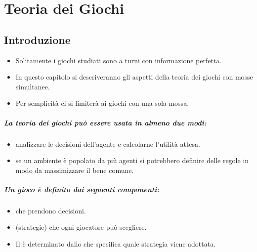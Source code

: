 \chapter{Teoria dei Giochi}

\section{Introduzione}



\begin{itemize}
  \item Solitamente i giochi studiati sono a turni con informazione perfetta. 
  \item In questo capitolo si descriveranno gli aspetti della teoria dei giochi con mosse simultanee. 
  \item Per semplicità ci si limiterà ai giochi con una sola mossa.
\end{itemize}


\paragraph{La teoria dei giochi può essere usata in almeno due modi:}

\begin{itemize}
  \item {} analizzare le decisioni dell'agente e calcolarne l'utilità attesa.
  \item {} se un ambiente è popolato da più agenti si potrebbero definire delle regole in modo da massimizzare il bene comune.
\end{itemize}

\paragraph{Un gioco è definito dai seguenti componenti:}

\begin{itemize}
  \item {} che prendono decisioni. 
  \item {} (strategie) che ogni giocatore può scegliere. 
  \item Il  è determinato dallo  che specifica quale strategia viene adottata.
\end{itemize}

